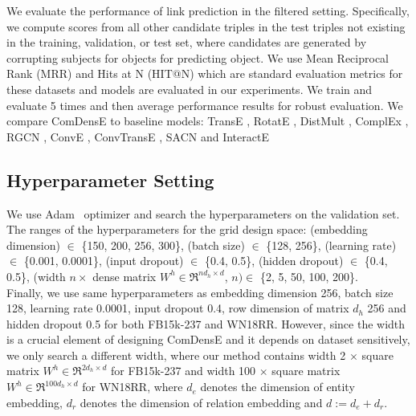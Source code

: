 We evaluate the performance of link prediction in the filtered setting. Specifically, we compute scores from all other candidate triples in the test triples not existing in the training, validation, or test set, where candidates are generated by corrupting subjects for objects for predicting object. We use Mean Reciprocal Rank (MRR) and Hits at N (HIT@N) which are standard evaluation metrics for these datasets and models are evaluated in our experiments. We train and evaluate 5 times and then average performance results for robust evaluation. We compare ComDensE to baseline models: TransE \cite{bordes2013translating}, RotatE \cite{sun2019rotate}, DistMult \cite{yang2014embedding}, ComplEx \cite{trouillon2016complex}, RGCN \cite{schlichtkrull2018modeling}, ConvE \cite{dettmers2018convolutional}, ConvTransE \cite{shang2019end}, SACN \cite{shang2019end} and InteractE \cite{vashishth2020interacte}


\subsection{Hyperparameter Setting}
We use Adam~\cite{kingma2014adam} optimizer and search the hyperparameters on the validation set. The ranges of the hyperparameters for the grid design space: (embedding dimension) $\in$ \{150, 200, 256, 300\}, (batch size) $\in$ \{128, 256\}, (learning rate) $\in$ \{0.001, 0.0001\}, (input dropout) $\in$ \{0.4, 0.5\}, (hidden dropout) $\in$ \{0.4, 0.5\}, (width $n \times $ dense matrix $W^h \in \Re^{nd_h \times d}$, $n) \in$ \{2, 5, 50, 100, 200\}.\\
\indent Finally, we use same hyperparameters as embedding dimension 256, batch size 128, learning rate 0.0001, input dropout 0.4, row dimension of matrix $d_h$ 256 and hidden dropout 0.5 for both FB15k-237 and WN18RR. However, since the width is a crucial element of designing ComDensE and it depends on dataset sensitively, we only search a different width, where our method contains width 2 $\times$ square matrix $W^h \in \Re^{2d_h \times d}$ for FB15k-237 and width 100 $\times$ square matrix $W^h \in \Re^{100d_h \times d}$ for WN18RR, where $d_e$ denotes the dimension of entity embedding, $d_r$ denotes the dimension of relation embedding and $d := d_e + d_r$.